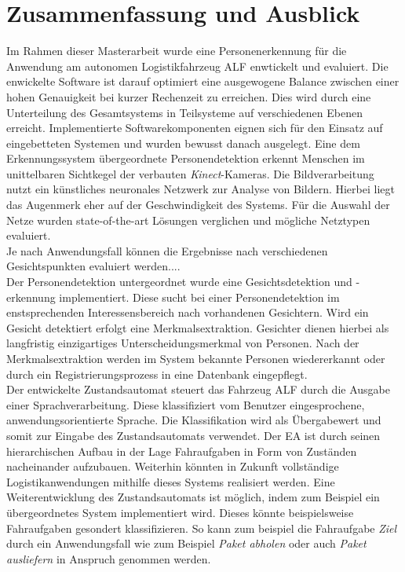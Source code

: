 \chapter{Zusammenfassung und Ausblick}
\label{Fazit und Ausblick}
	
Im Rahmen dieser Masterarbeit wurde eine Personenerkennung für die Anwendung am autonomen Logistikfahrzeug ALF enwtickelt und evaluiert. Die enwickelte Software ist darauf optimiert eine ausgewogene Balance zwischen einer hohen Genauigkeit bei kurzer Rechenzeit zu erreichen. Dies wird durch eine Unterteilung des Gesamtsystems in Teilsysteme auf verschiedenen Ebenen erreicht. Implementierte Softwarekomponenten eignen sich für den Einsatz auf eingebetteten Systemen und wurden bewusst danach ausgelegt. Eine dem Erkennungssystem übergeordnete Personendetektion erkennt Menschen im unittelbaren Sichtkegel der verbauten \textit{Kinect}-Kameras. Die Bildverarbeitung nutzt ein künstliches neuronales Netzwerk zur Analyse von Bildern. Hierbei liegt das Augenmerk eher auf der Geschwindigkeit des Systems. Für die Auswahl der Netze wurden state-of-the-art Lösungen verglichen und mögliche Netztypen evaluiert.\\

Je nach Anwendungsfall können die Ergebnisse nach verschiedenen Gesichtspunkten evaluiert werden....\\

Der Personendetektion untergeordnet wurde eine Gesichtsdetektion und -erkennung implementiert. Diese sucht bei einer Personendetektion im enstsprechenden Interessensbereich nach vorhandenen Gesichtern. Wird ein Gesicht detektiert erfolgt eine Merkmalsextraktion. Gesichter dienen hierbei als langfristig einzigartiges Unterscheidungsmerkmal von Personen. Nach der Merkmalsextraktion werden im System bekannte Personen wiedererkannt oder durch ein Registrierungsprozess in eine Datenbank eingepflegt.\\

Der entwickelte Zustandsautomat steuert das Fahrzeug ALF durch die Ausgabe einer Sprachverarbeitung. Diese klassifiziert vom Benutzer eingesprochene, anwendungsorientierte Sprache. Die Klassifikation wird als Übergabewert und somit zur Eingabe des Zustandsautomats verwendet. Der EA ist durch seinen hierarchischen Aufbau in der Lage Fahraufgaben in Form von Zuständen nacheinander aufzubauen. Weiterhin könnten in Zukunft vollständige Logistikanwendungen mithilfe dieses Systems realisiert werden. Eine Weiterentwicklung des Zustandsautomats ist möglich, indem zum Beispiel ein übergeordnetes System implementiert wird. Dieses könnte beispielsweise Fahraufgaben gesondert klassifizieren. So kann zum beispiel die Fahraufgabe \textit{Ziel} durch ein Anwendungsfall wie zum Beispiel \textit{Paket abholen} oder auch \textit{Paket ausliefern} in Anspruch genommen werden.\\



